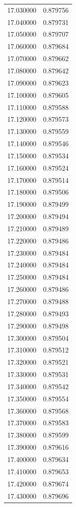 \begin{tabular}{rr}
17.030000 & 0.879756 \\
17.040000 & 0.879731 \\
17.050000 & 0.879707 \\
17.060000 & 0.879684 \\
17.070000 & 0.879662 \\
17.080000 & 0.879642 \\
17.090000 & 0.879623 \\
17.100000 & 0.879605 \\
17.110000 & 0.879588 \\
17.120000 & 0.879573 \\
17.130000 & 0.879559 \\
17.140000 & 0.879546 \\
17.150000 & 0.879534 \\
17.160000 & 0.879524 \\
17.170000 & 0.879514 \\
17.180000 & 0.879506 \\
17.190000 & 0.879499 \\
17.200000 & 0.879494 \\
17.210000 & 0.879489 \\
17.220000 & 0.879486 \\
17.230000 & 0.879484 \\
17.240000 & 0.879484 \\
17.250000 & 0.879484 \\
17.260000 & 0.879486 \\
17.270000 & 0.879488 \\
17.280000 & 0.879493 \\
17.290000 & 0.879498 \\
17.300000 & 0.879504 \\
17.310000 & 0.879512 \\
17.320000 & 0.879521 \\
17.330000 & 0.879531 \\
17.340000 & 0.879542 \\
17.350000 & 0.879554 \\
17.360000 & 0.879568 \\
17.370000 & 0.879583 \\
17.380000 & 0.879599 \\
17.390000 & 0.879616 \\
17.400000 & 0.879634 \\
17.410000 & 0.879653 \\
17.420000 & 0.879674 \\
17.430000 & 0.879696 \\

\end{tabular}
